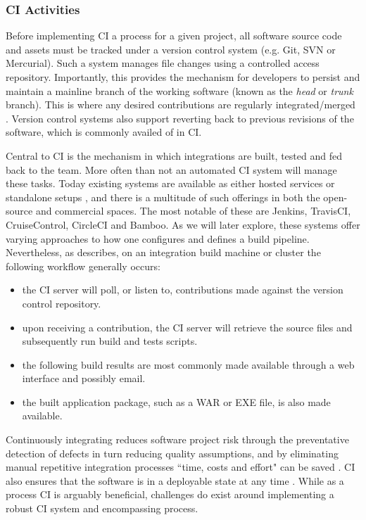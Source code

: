 \documentclass{report}
\begin{document}
\subsubsection{CI Activities}
Before implementing CI a process for a given project, all software source code
and assets must be tracked under a version control system (e.g. Git, SVN or Mercurial).
Such a system manages file changes using a controlled access repository. Importantly,
this provides the mechanism for developers to persist and maintain a mainline branch of the working software 
(known as the \textit{head} or \textit{trunk} branch). This is where any desired contributions are regularly 
integrated/merged \citep{Vas}. Version control systems also support reverting back to
previous revisions of the software, which is commonly availed of in CI. 
\par
Central to CI is the mechanism in which integrations are built, tested and fed back to the team. 
More often than not an automated CI system will manage these tasks. Today existing systems
are available as either hosted services or standalone setups \citep{Gous}, and there is
a multitude of such offerings in both the open-source and commercial spaces. 
The most notable of these are Jenkins, TravisCI, CruiseControl, CircleCI and Bamboo. 
As we will later explore, these systems offer varying approaches to how one configures and
defines a build pipeline. Nevertheless, as \citet{Duvall} describes, on an integration build machine or cluster the following workflow generally occurs:
\begin{itemize}  
\item the CI server will poll, or listen to, contributions 
made against the version control repository.
\item upon receiving a contribution, the CI 
server will retrieve the source files and subsequently run build and tests scripts. 
\item the following build results are most commonly made available through a web interface and possibly
email.
\item the built application package, such as a WAR or EXE file, is also made available.
\end{itemize}
\par
Continuously integrating reduces software project risk through 
the preventative detection of defects in turn reducing quality 
assumptions, and by eliminating manual repetitive integration
processes ``time, costs and effort" can be saved \citep{Vas}.
CI also ensures that the software is in a deployable state at any time \citep{Jez}.
While as a process CI is arguably beneficial, challenges 
do exist around implementing a robust CI system 
and encompassing process.
\end{document}
